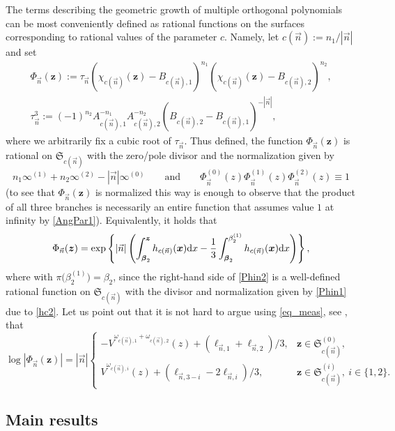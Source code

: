 \documentclass[pdftex]{sigma}
\numberwithin{equation}{section}
\newcommand{\n}{{\vec n}}
\newcommand{\RS}{\boldsymbol{\mathfrak{S}}}
\newcommand{\z}	{{\boldsymbol z}}
\newcommand{\x}	{{\boldsymbol x}}
\begin{document}
The terms describing the geometric growth of multiple orthogonal polynomials can be most conveniently defined as rational functions on the surfaces corresponding to rational values of the parameter $ c $. Namely, let $ c(\n) := n_1/|\n| $ and set
\begin{gather}
\Phi_\n(\z) := \tau_\n(\chi_{c(\n)}(\z)-B_{c(\n),1})^{n_1}(\chi_{c(\n)}(\z)-B_{c(\n),2})^{n_2}, \nonumber \\
\tau_\n^3 := (-1)^{n_2}A_{c(\n),1}^{-n_1}A_{c(\n),2}^{-n_2}(B_{c(\n),2}-B_{c(\n),1})^{-|\n|},\label{Phin}
\end{gather}
where we arbitrarily fix a cubic root of $ \tau_\n $. Thus defined, the function $ \Phi_\n(\z) $ is rational on $ \RS_{c(\n)} $ with the zero/pole divisor and the normalization given by
\begin{equation}
\label{Phin1}
n_1\infty^{(1)} + n_2\infty^{(2)} - |\n|\infty^{(0)} \qquad \text{and}\qquad  \Phi_\n^{(0)}(z)\Phi_\n^{(1)}(z)\Phi_\n^{(2)}(z) \equiv 1
\end{equation}
(to see that $ \Phi_\n(\z) $ is normalized this way is enough to observe that the product of all three branches is necessarily an entire function that assumes value $ 1 $ at infinity by \eqref{AngPar1}). Equivalently, it holds that
\begin{equation}
\label{Phin2}
\Phi_\n(\z) = \exp\left\{ |\n| \left(\int_{\boldsymbol \beta_2}^\z h_{c(\n)}(\x) {\rm d}x - \frac13\int_{\boldsymbol \beta_2}^{\beta_2^{(1)}} h_{c(\n)}(\x) {\rm d}x\right) \right\},
\end{equation}
where \smash{$ \beta_2^{(1)}\in\RS_{c(\n)}^{(1)} $} with $ \pi\bigl(\beta_2^{(1)}\bigr) = \beta_2 $, since the right-hand side of \eqref{Phin2} is a well-defined rational function on $ \RS_{c(\n)} $ with the divisor and normalization given by \eqref{Phin1} due to \eqref{hc2}. Let us point out that it is not hard to argue using \eqref{eq_meas}, see \cite[Proposition~2.1]{Ya16}, that
\begin{equation}
\label{Phin3}
\log|\Phi_\n(\z)| = |\n|\begin{cases}
-V^{\omega_{c(\n),1}+\omega_{c(\n),2}}(z)+ (\ell_{\n,1}+\ell_{\n,2})/3, & \z\in\RS_{c(\n)}^{(0)}, \\
V^{\omega_{c(\n),i}}(z)+ (\ell_{\n,3-i}-2\ell_{\n,i})/3, & \z\in\RS_{c(\n)}^{(i)}, \ i\in\{1,2\}.
\end{cases}
\end{equation}

\subsection{Main results}
\end{document}
